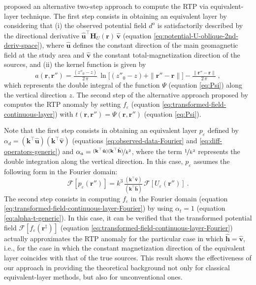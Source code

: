 \citet{guspi_novara2009} proposed an alternative two-step approach to compute the RTP via equivalent-layer technique. 
The first step consists in obtaining an equivalent layer by considering that (i) the observed potential field $d^{o}$
is satisfactorily described by the directional derivative 
$\hat{\mathbf{u}}^{\top} \mathbf{H}_{U}(\mathbf{r}) \, \hat{\mathbf{v}}$ 
(equation \ref{eq:potential-U-oblique-2nd-deriv-space}), where $\hat{\mathbf{u}}$ defines the constant direction of the main geomagnetic
field at the study area and $\hat{\mathbf{v}}$ the constant total-magnetization direction of the sources, and (ii)
the kernel function is given by 
\begin{equation}
	a(\mathbf{r}, \mathbf{r}'') = \tfrac{\left( z''_{0} - z \right)}{2 \, \pi} \, 
	\ln{\Big[} \left( z''_{0} - z \right) + \| \mathbf{r}'' - \mathbf{r} \| {\Big]} - 
	\tfrac{\| \mathbf{r}'' - \mathbf{r} \|}{2 \, \pi} \: ,
	\label{eq:kernel-Fourier-Guspi}
\end{equation}
which represents the double integral of the function $\Psi$ (equation \ref{eq:Psi}) 
along the vertical direction $z$.
The second step of the alternative approach proposed by \citet{guspi_novara2009} computes the RTP anomaly 
by setting $f_{\varepsilon}$ (equation \ref{eq:transformed-field-continuous-layer}) with 
$t(\mathbf{r}, \mathbf{r}'') = \Psi(\mathbf{r}, \mathbf{r}'')$ (equation \ref{eq:Psi}).

Note that the first step consists in obtaining an equivalent layer $p_{\varepsilon}$ defined by 
$\alpha_{d} = (\mathbf{k}^{\top} \hat{\mathbf{u}}) (\mathbf{k}^{\top} \hat{\mathbf{v}})$ (equations \ref{eq:observed-data-Fourier} 
and \ref{eq:diff-operators-generic}) and 
$\alpha_{a} = \nicefrac{(\mathbf{k}^{\top} \hat{\mathbf{u}}) (\mathbf{k}^{\top} \hat{\mathbf{h}})}{k^{2}}$, 
where the term $\nicefrac{1}{k^{2}}$ represents the double integration along the vertical direction. In this case,  
$p_{\varepsilon}$ assumes the following form in the Fourier domain:
\begin{equation}
	\mathcal{F} [ p_{\varepsilon}(\mathbf{r}'') ] =
	k^{3} \, \tfrac{\left(\mathbf{k}^{\top} \hat{\mathbf{v}} \right)}{\left(\mathbf{k}^{\top} \hat{\mathbf{h}} \right)} \,
	\mathcal{F} \left[ U_{\varepsilon}(\mathbf{r}'') \right] \: .
	\label{eq:p-Fourier-guspi}
\end{equation}
The second step consists in computing $f_{\varepsilon}$ in the Fourier domain (equation \ref{eq:transformed-field-continuous-layer-Fourier}) 
by using $\alpha_{t} = 1$ (equation \ref{eq:alpha-t-generic}).
In this case, it can be verified that the transformed potential field $\mathcal{F} [ f_{\varepsilon}(\mathbf{r}^{\ddagger}) ]$ 
(equation \ref{eq:transformed-field-continuous-layer-Fourier}) actually approximates the RTP anomaly for the particular case 
in which $\hat{\mathbf{h}} = \hat{\mathbf{v}}$, 
i.e., for the case in which the constant magnetization direction of the equivalent layer coincides with that of the true sources.
This result shows the effectiveness of our approach in providing the theoretical background not only for classical 
equivalent-layer methods, but also for unconventional ones.